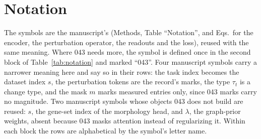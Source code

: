 
\section{Notation}
\label{sec:notation}

The symbols are the manuscript's (Methods, Table ``Notation'', and Eqs.\ for the encoder,
the perturbation operator, the readouts and the loss), reused with the same meaning.
Where 043 needs more, the symbol is defined once in the second block of
Table~\ref{tab:notation} and marked ``043''. Four manuscript symbols carry a narrower
meaning here and say so in their rows: the task index becomes the dataset index $s$,
the perturbation tokens are the record's marks, the type $\tau_t$ is a change type, and the
mask $m$ marks measured entries only, since 043 marks carry no magnitude. Two manuscript
symbols whose objects 043 does not build are reused: $s$, the gene-set index of the
morphology head, and $\lambda$, the graph-prior weights, absent because 043 masks attention
instead of regularizing it. Within each block the rows are alphabetical by the symbol's
letter name.

